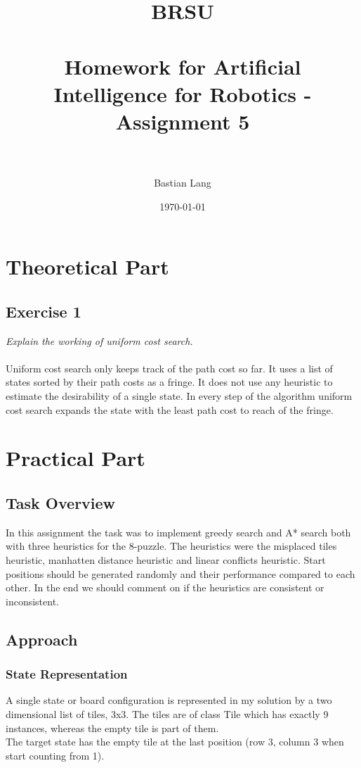 \documentclass[paper=a4, fontsize=11pt]{scrartcl} %
\title{	
\normalfont \normalsize 
\textsc{BRSU} \\ [25pt] %
\horrule{0.5pt} \\[0.4cm] %
\huge Homework for Artificial Intelligence for Robotics - Assignment 5 \\ %
\horrule{2pt} \\[0.5cm] %
}
\author{Bastian Lang} %
\date{\normalsize\today} %
\numberwithin{equation}{section} %
\numberwithin{figure}{section} %
\numberwithin{table}{section} %
\begin{document}
\maketitle %

\section{Theoretical Part}
\subsection{Exercise 1}
\emph{Explain the working of uniform cost search.}\\\\

Uniform cost search only keeps track of the path cost so far. It uses a list of states sorted by their path costs as a fringe. It does not use any heuristic to estimate the desirability of a single state. In every step of the algorithm uniform cost search expands the state with the least path cost to reach of the fringe.



\section{Practical Part}
\subsection{Task Overview}
In this assignment the task was to implement greedy search and A* search both with three heuristics for the 8-puzzle. The heuristics were the misplaced tiles heuristic, manhatten distance heuristic and linear conflicts heuristic. Start positions should be generated randomly and their performance compared to each other. In the end we should comment on if the heuristics are consistent or inconsistent.


\subsection{Approach}
\subsubsection{State Representation}
A single state or board configuration is represented in my solution by a two dimensional list of tiles, 3x3. The tiles are of class Tile which has exactly 9 instances, whereas the empty tile is part of them.\\
The target state has the empty tile at the last position (row 3, column 3 when start counting from 1).
\end{document}
